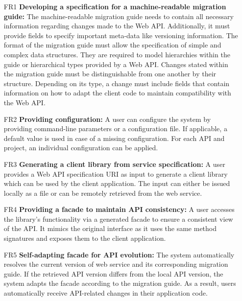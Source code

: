 \begin{itemize}[itemindent=-4pt, leftmargin=34pt, align=left]
    \item [FR1\hphantom{1}]  \textbf{Developing a specification for a machine-readable migration guide:} The machine-readable migration guide needs to contain all necessary information regarding changes made to the Web API. Additionally, it must provide fields to specify important meta-data like versioning information. The format of the migration guide must allow the specification of simple and complex data structures. They are required to model hierarchies within the guide or hierarchical types provided by a Web API. Changes stated within the migration guide must be distinguishable from one another by their structure. Depending on its type, a change must include fields that contain information on how to adapt the client code to maintain compatibility with the Web API.
    \item [FR2\hphantom{1}]  \textbf{Providing configuration:} A user can configure the system by providing command-line parameters or a configuration file. If applicable, a default value is used in case of a missing configuration. For each API and project, an individual configuration can be applied.
    \item [FR3\hphantom{1}]  \textbf{Generating a client library from service specification:} A user provides a Web API specification URI as input to generate a client library which can be used by the client application. The input can either be issued locally as a file or can be remotely retrieved from the web service.
    \item [FR4\hphantom{1}]  \textbf{Providing a facade to maintain API consistency:} A user accesses the library's functionality via a generated facade to ensure a consistent view of the API. It mimics the original interface as it uses the same method signatures and exposes them to the client application.
     \item [FR5\hphantom{1}] 
     \textbf{Self-adapting facade for API evolution:} The system automatically resolves the current version of web service and its corresponding migration guide. If the retrieved API version differs from the local API version, the system adapts the facade according to the migration guide. As a result, users automatically receive API-related changes in their application code.

\end{itemize}
